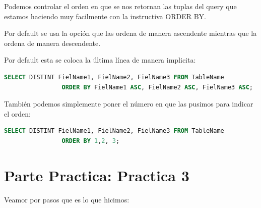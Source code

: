 \documentclass[12pt, fleqn]{article}                             %
\newcommand \Quote {\qq}                                        %
\begin{document}
        Podemos controlar el orden en que se nos retornan las tuplas del query que estamos
        haciendo muy facilmente con la instructiva ORDER BY.

        Por default se usa la opción \Quote{ASC} que las ordena de manera ascendente
        mientras que \Quote{DESC} la ordena de manera descendente.

        Por default esta se coloca la última línea de manera implicita:
        \begin{lstlisting}[language=SQL, gobble=12]
            SELECT DISTINT FielName1, FielName2, FielName3 FROM TableName
                ORDER BY FielName1 ASC, FielName2 ASC, FielName3 ASC;
        \end{lstlisting}

        También podemos simplemente poner el número en que las pusimos para 
        indicar el orden:

        \begin{lstlisting}[language=SQL, gobble=12]
            SELECT DISTINT FielName1, FielName2, FielName3 FROM TableName
                ORDER BY 1,2, 3;
        \end{lstlisting}




\clearpage
\section{Parte Practica: Practica 3}

    Veamor por pasos que es lo que hicimos:
\end{document}
